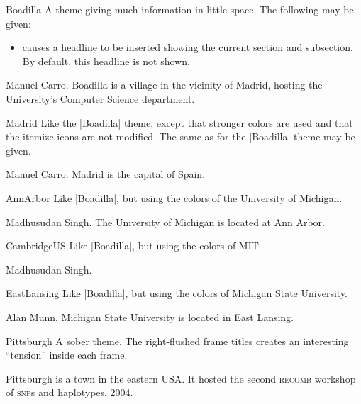 \begin{themeexample}{Boadilla}
  A theme giving much information in little space. The following  may be given:
  \begin{itemize}
  \item {} causes a headline to be inserted showing the current section and subsection. By default, this headline is not shown.
  \end{itemize}

  \themeauthor Manuel Carro. Boadilla is a village in the vicinity of Madrid, hosting the University's Computer Science department.
\end{themeexample}

\begin{themeexample}{Madrid}
  Like the |Boadilla| theme, except that stronger colors are used and that the itemize icons are not modified. The same  as for the |Boadilla| theme may be given.

  \themeauthor Manuel Carro. Madrid is the capital of Spain.
\end{themeexample}

\begin{themeexample}{AnnArbor}
  Like |Boadilla|, but using the colors of the University of Michigan.

  \themeauthor Madhusudan Singh. The University of Michigan is located at Ann Arbor.
\end{themeexample}

\begin{themeexample}{CambridgeUS}
  Like |Boadilla|, but using the colors of MIT.

  \themeauthor Madhusudan Singh.
\end{themeexample}

\begin{themeexample}{EastLansing}
  Like |Boadilla|, but using the colors of Michigan State University.
  
  \themeauthor Alan Munn. Michigan State University is located in East Lansing.
\end{themeexample}

\begin{themeexample}{Pittsburgh}
  A sober theme. The right-flushed frame titles creates an interesting ``tension'' inside each frame.

  Pittsburgh is a town in the eastern USA. It hosted the second \textsc{recomb} workshop of \textsc{snp}s and haplotypes, 2004.
\end{themeexample}

